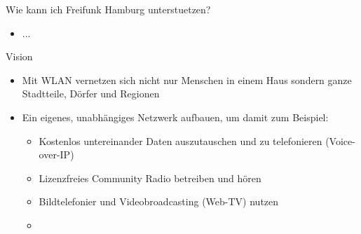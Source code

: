 \documentclass[aspectratio=43]{beamer}
\begin{document}
\begin{frame}{Wie kann ich Freifunk Hamburg unterstuetzen?}
	\begin{itemize}
		\item ...
	\end{itemize}
\end{frame}

\begin{frame}{Vision}
	\begin{itemize}
		\item Mit WLAN vernetzen sich nicht nur Menschen in einem Haus sondern ganze Stadtteile, Dörfer und Regionen %
		\item Ein eigenes, unabhängiges Netzwerk aufbauen, um damit zum Beispiel:
		\begin{itemize}
			\item Kostenlos untereinander Daten auszutauschen und zu telefonieren (Voice-over-IP)
			\item Lizenzfreies Community Radio betreiben und hören
			\item Bildtelefonier und Videobroadcasting (Web-TV) nutzen %
			\item <deine Idee hier> %
		\end{itemize}
	\end{itemize}
\end{frame}
\end{document}

